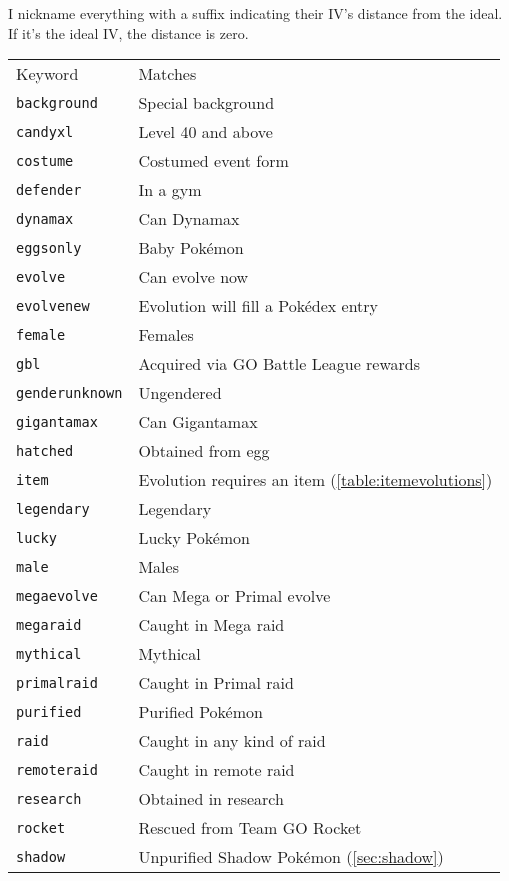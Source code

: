 I nickname everything with a suffix indicating their IV's distance from the ideal.
If it's the ideal IV, the distance is zero.

\begin{table}
\centering\small
\begin{tabular}{ll}
Keyword & Matches \\
\Midrule
\texttt{background} & Special background \\
\texttt{candyxl} & Level 40 and above \\
\texttt{costume} & Costumed event form \\
\texttt{defender} & In a gym \\
\texttt{dynamax} & Can Dynamax\\
\texttt{eggsonly} & Baby Pokémon \\
\texttt{evolve} & Can evolve now\\
\texttt{evolvenew} & Evolution will fill a Pokédex entry\\
\texttt{female} & Females \\
\texttt{gbl} & Acquired via GO Battle League rewards\\
\texttt{genderunknown} & Ungendered \\
\texttt{gigantamax} & Can Gigantamax\\
\texttt{hatched} & Obtained from egg \\
\texttt{item} & Evolution requires an item (\autoref{table:itemevolutions})\\
\texttt{legendary} & Legendary \\
\texttt{lucky} & Lucky Pokémon \\
\texttt{male} & Males\\
\texttt{megaevolve} & Can Mega or Primal evolve\\
\texttt{megaraid} & Caught in Mega raid\\
\texttt{mythical} & Mythical\\
\texttt{primalraid} & Caught in Primal raid\\
\texttt{purified} & Purified Pokémon\\
\texttt{raid} & Caught in any kind of raid\\
\texttt{remoteraid} & Caught in remote raid\\
\texttt{research} & Obtained in research\\
\texttt{rocket} & Rescued from Team GO Rocket\\
\texttt{shadow} & Unpurified Shadow Pokémon (\autoref{sec:shadow})\\

\end{tabular}
\end{table}
